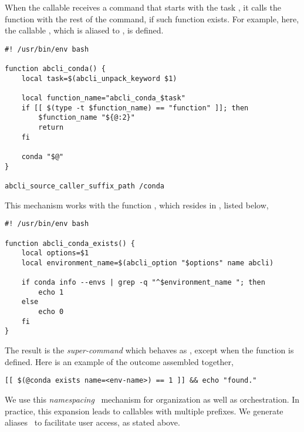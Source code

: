 
When the callable  receives a command that starts with the task , it calls the function  with the rest of the command, if such function exists. For example, here, the callable , which is aliased to , is defined.

\begin{verbatim}
#! /usr/bin/env bash

function abcli_conda() {
    local task=$(abcli_unpack_keyword $1)

    local function_name="abcli_conda_$task"
    if [[ $(type -t $function_name) == "function" ]]; then
        $function_name "${@:2}"
        return
    fi

    conda "$@"
}

abcli_source_caller_suffix_path /conda
\end{verbatim}
%
This mechanism works with the function , which resides in , listed below,
%
\begin{verbatim}
#! /usr/bin/env bash

function abcli_conda_exists() {
    local options=$1
    local environment_name=$(abcli_option "$options" name abcli)

    if conda info --envs | grep -q "^$environment_name "; then
        echo 1
    else
        echo 0
    fi
}    
\end{verbatim}
%
The result is the \emph{super-command}  which behaves as , except when the function  is defined. Here is an example of the outcome assembled together,
%
\begin{verbatim}
[[ $(@conda exists name=<env-name>) == 1 ]] && echo "found."
\end{verbatim}
%
We use this \emph{namespacing}~\cite{namespaces} mechanism for organization as well as orchestration. In practice, this expansion leads to callables with multiple prefixes. We generate  aliases~\cite{aliases} to facilitate user access, as stated above. 